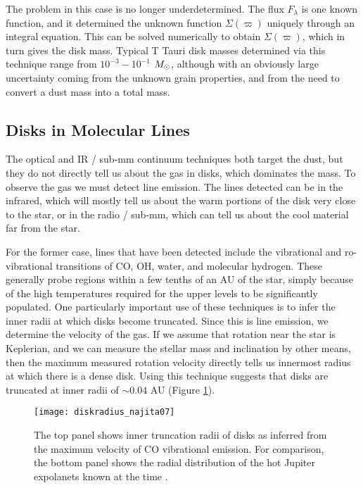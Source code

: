 The problem in this case is no longer underdetermined. The flux $F_{\lambda}$ is one known function, and it determined the unknown function $\Sigma(\varpi)$ uniquely through an integral equation. This can be solved numerically to obtain $\Sigma(\varpi)$, which in turn gives the disk mass. Typical T Tauri disk masses determined via this technique range from $10^{-3}-10^{-1}$ $M_{\odot}$, although with an obviously large uncertainty coming from the unknown grain properties, and from the need to convert a dust mass into a total mass.

\subsection{Disks in Molecular Lines}

The optical and IR / sub-mm continuum techniques both target the dust, but they do not directly tell us about the gas in disks, which dominates the mass. To observe the gas we must detect line emission. The lines detected can be in the infrared, which will mostly tell us about the warm portions of the disk very close to the star, or in the radio / sub-mm, which can tell us about the cool material far from the star.

For the former case, lines that have been detected include the vibrational and ro-vibrational transitions of CO, OH, water, and molecular hydrogen. These generally probe regions within a few tenths of an AU of the star, simply because of the high temperatures required for the upper levels to be significantly populated. One particularly important use of these techniques is to infer the inner radii at which disks become truncated. Since this is line emission, we determine the velocity of the gas. If we assume that rotation near the star is Keplerian, and we can measure the stellar mass and inclination by other means, then the maximum measured rotation velocity directly tells us innermost radius at which there is a dense disk. Using this technique suggests that disks are truncated at inner radii of $\sim 0.04$ AU (Figure \ref{fig:diskradius_najita07}).

\begin{figure}
\texttt{[image: diskradius\_najita07]}
\caption[Inner disk radii from CO line emission]{
\label{fig:diskradius_najita07}
The top panel shows inner truncation radii of disks as inferred from the maximum velocity of CO vibrational emission. For comparison, the bottom panel shows the radial distribution of the hot Jupiter expolanets known at the time \citep{najita07b}.
}
\end{figure}

